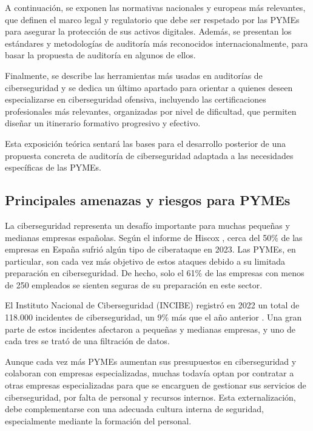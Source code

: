 \documentclass[a4paper, 11pt]{article}
\begin{document}
A continuación, se exponen las normativas nacionales y europeas más relevantes, que definen el marco legal y regulatorio que debe ser respetado por las PYMEs para asegurar la protección de sus activos 
digitales. Además, se presentan los estándares y metodologías de auditoría más reconocidos internacionalmente, para basar la propuesta de auditoría en algunos de ellos.

Finalmente, se describe las herramientas más usadas en auditorías de ciberseguridad y se dedica un último apartado para orientar a quienes deseen especializarse en ciberseguridad ofensiva, incluyendo las certificaciones profesionales más relevantes, organizadas por nivel de dificultad, que permiten diseñar un itinerario formativo progresivo y efectivo.

Esta exposición teórica sentará las bases para el desarrollo posterior de una propuesta concreta de auditoría de ciberseguridad adaptada a las necesidades específicas de las PYMEs.


\subsection{Principales amenazas y riesgos para PYMEs}


La ciberseguridad representa un desafío importante para muchas pequeñas y medianas empresas españolas. Según el informe de Hiscox \cite{hiscox}, cerca del 50\% de las empresas en España sufrió algún tipo de ciberataque en 2023. Las PYMEs, en particular, son cada vez más objetivo de estos ataques debido a su limitada preparación en ciberseguridad. De hecho, solo el 61\% de las empresas con menos de 250 empleados se sienten seguras de su preparación en este sector. 


El Instituto Nacional de Ciberseguridad (INCIBE) registró en 2022 un total de 118.000 incidentes de ciberseguridad, un 9\% más que el año anterior \cite{incibe2023}. Una gran parte de estos incidentes afectaron a pequeñas y medianas empresas, y uno de cada tres se trató de una filtración de datos.


Aunque cada vez más PYMEs aumentan sus presupuestos en ciberseguridad y colaboran con empresas especializadas, muchas todavía optan por contratar a otras empresas especializadas para que se encarguen de gestionar sus servicios de ciberseguridad, 
por falta de personal y recursos internos. Esta externalización, debe complementarse con una adecuada cultura interna de seguridad, especialmente mediante la formación del personal.
\end{document}
